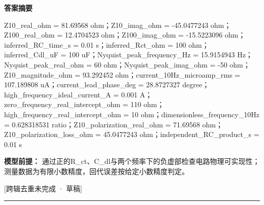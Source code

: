 \documentclass[UTF8,11pt,a4paper]{ctexart}
\begin{document}
\noindent\textbf{答案摘要}\par
Z10\_real\_ohm = 81.69568 ohm；Z10\_imag\_ohm = -45.0477243 ohm；Z100\_real\_ohm = 12.4704523 ohm；Z100\_imag\_ohm = -15.5223096 ohm；inferred\_RC\_time\_s = 0.01 s；inferred\_Rct\_ohm = 100 ohm；inferred\_Cdl\_uF = 100 uF；Nyquist\_peak\_frequency\_Hz = 15.9154943 Hz；Nyquist\_peak\_real\_ohm = 60 ohm；Nyquist\_peak\_imag\_ohm = -50 ohm；Z10\_magnitude\_ohm = 93.292452 ohm；current\_10Hz\_microamp\_rms = 107.189808 uA；current\_lead\_phase\_deg = 28.8727327 degree；high\_frequency\_ideal\_current\_A = 0.001 A；zero\_frequency\_real\_intercept\_ohm = 110 ohm；high\_frequency\_real\_intercept\_ohm = 10 ohm；dimensionless\_frequency\_10Hz = 0.628318531 ratio；Z10\_polarization\_real\_ohm = 71.69568 ohm；Z10\_polarization\_loss\_ohm = 45.0477243 ohm；independent\_RC\_product\_s = 0.01 s\par
\noindent\textbf{模型前提：}
通过正的R\_ct、C\_dl与两个频率下的负虚部检查电路物理可实现性；测量数据为有限小数精度，回代误差按给定小数精度判定。\par
\noindent\textcolor{red!65!black}{[跨辑去重未完成 · 草稿]} \par
\medskip\hrule\medskip
{}
\end{document}
